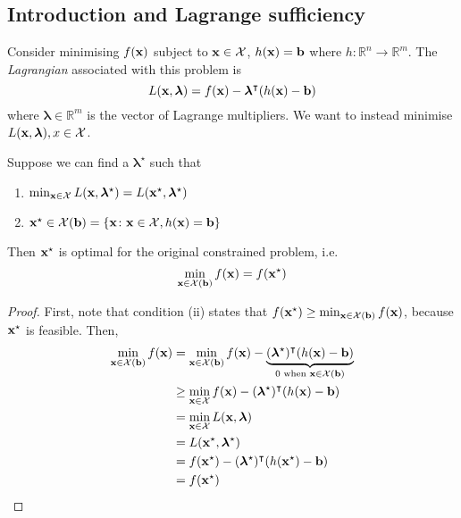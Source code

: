 \subsection{Introduction and Lagrange sufficiency}
Consider minimising \(f(\vb x)\) subject to \(\vb x \in \mathcal X\), \(h(\vb x) = \vb b\) where \(h \colon \mathbb R^n \to \mathbb R^m\).
The \textit{Lagrangian} associated with this problem is
\[
	L(\vb x, \bm \lambda) = f(\vb x) - \bm \lambda^\intercal(h(\vb x) - \vb b)
\]
where \(\bm\lambda \in \mathbb R^m\) is the vector of Lagrange multipliers.
We want to instead minimise \(L(\vb x, \bm \lambda), x \in \mathcal X\).
\begin{theorem}
	Suppose we can find a \(\bm \lambda^\star\) such that
	\begin{enumerate}
		\item \(\min_{\vb x \in \mathcal X} L(\vb x, \bm \lambda^\star) = L(\vb x^\star, \bm\lambda^\star)\)
		\item \(\vb x^\star \in \mathcal X(\vb b) = \qty{\vb x \colon \vb x \in \mathcal X, h(\vb x) = \vb b}\)
	\end{enumerate}
	Then \(\vb x^\star\) is optimal for the original constrained problem, i.e.
	\[
		\min_{\vb x \in \mathcal X(\vb b)} f(\vb x) = f(\vb x^\star)
	\]
\end{theorem}
\begin{proof}
	First, note that condition (ii) states that \(f(\vb x^\star) \geq \min_{\vb x \in \mathcal X(\vb b)}f(\vb x)\), because \(\vb x^\star\) is feasible.
	Then,
	\begin{align*}
		\min_{\vb x \in \mathcal X(\vb b)}f(\vb x) & = \min_{\vb x \in \mathcal X(\vb b)} f(\vb x) - \underbrace{(\bm\lambda^\star)^\intercal (h(\vb x) - \vb b)}_{0 \text{ when } \vb x \in \mathcal X(\vb b)} \\
		                                           & \geq \min_{\vb x \in \mathcal X} f(\vb x) - (\bm\lambda^\star)^\intercal (h(\vb x) - \vb b)                                                                \\
		                                           & = \min_{\vb x \in \mathcal X} L(\vb x, \bm \lambda)                                                                                                         \\
		                                           & = L(\vb x^\star, \bm \lambda^\star)                                                                                                                         \\
		                                           & = f(\vb x^\star) - (\bm\lambda^\star)^\intercal (h(\vb x^\star) - \vb b)                                                                                   \\
		                                           & = f(\vb x^\star)
	\end{align*}
\end{proof}

